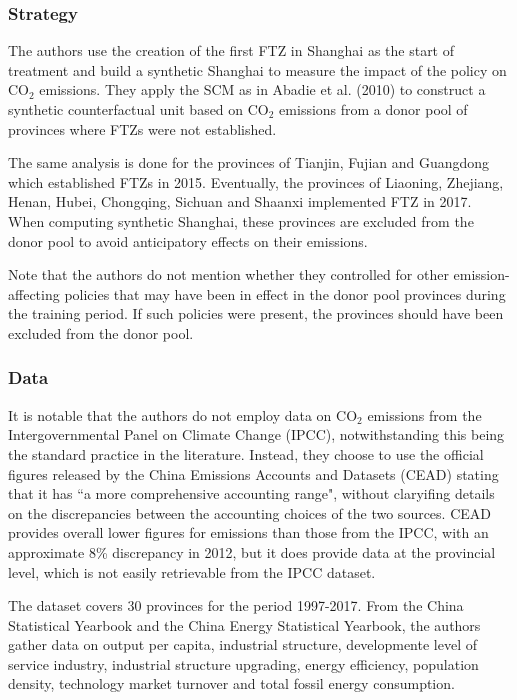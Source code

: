 \documentclass[12pt,a4paper,draft]{article}
\begin{document}
\subsubsection{Strategy}
The authors use the creation of the first FTZ in Shanghai as the start of treatment 
and build a synthetic Shanghai to measure the impact of the policy on CO$_2$ 
emissions. They apply the SCM as in Abadie et al. (2010) to construct a synthetic 
counterfactual unit based on CO$_2$ emissions from a donor pool of provinces 
where FTZs were not established. 

The same analysis is done for the provinces of Tianjin, Fujian and Guangdong 
which established FTZs in 2015. Eventually, the provinces of Liaoning, 
Zhejiang, Henan, Hubei, Chongqing, Sichuan and Shaanxi implemented FTZ in 2017.
When computing synthetic Shanghai, these provinces are excluded from the donor 
pool to avoid anticipatory effects on their emissions.

Note that the authors do not mention whether they controlled for other 
emission-affecting policies that may have been in effect in the donor pool 
provinces during the training period. If such policies were present, the 
provinces should have been excluded from the donor pool.


\subsubsection{Data}
It is notable that the authors do not employ data on CO$_2$ emissions from the 
Intergovernmental Panel on Climate Change (IPCC), notwithstanding this being the 
standard practice in the literature. Instead, they choose to use the official 
figures released by the China Emissions Accounts and Datasets (CEAD) stating that 
it has ``a more comprehensive accounting range", without claryifing details on the 
discrepancies between the accounting choices of the two sources. CEAD provides 
overall lower figures for emissions than those from the IPCC, with an approximate 
8\% discrepancy in 2012, but it does provide data at the provincial level, which is 
not easily retrievable from the IPCC dataset.  

The dataset covers 30 provinces for the period 1997-2017. 
From the China Statistical 
Yearbook and the China Energy Statistical Yearbook, the authors gather data on 
output per capita, industrial structure, developmente level of service industry, 
industrial structure upgrading, energy efficiency, population density, technology 
market turnover and total fossil energy consumption. 
\end{document}
